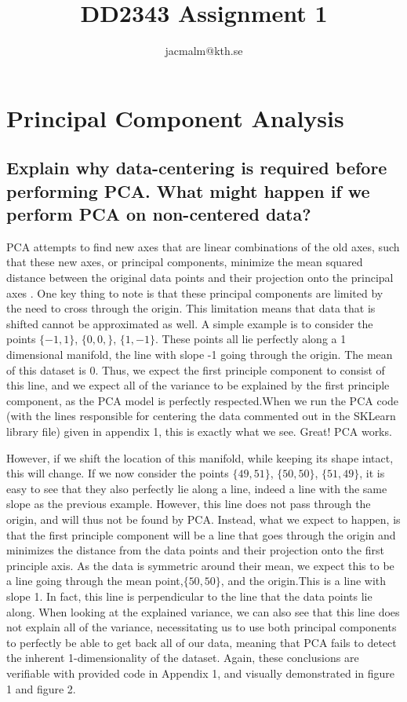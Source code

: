 \documentclass[11pt,a4paper,landscape]{article}
\author{jacmalm@kth.se}
\title{DD2343 Assignment 1}
\begin{document}
\maketitle
\newpage
\section{Principal Component Analysis}

\subsection{Explain why data-centering is required before performing PCA.  What might happen if we perform PCA on non-centered data?}

PCA attempts to find new axes that are linear combinations of the old axes, such that these new axes, or principal components, minimize the mean squared distance between the original data points and their projection onto the principal axes \cite{pca_lecture_book}.  One key thing to note is that these principal components are limited by the need to cross through the origin. This limitation means that data that is shifted cannot be approximated as well. A simple example is to consider the points $\lbrace-1, 1\rbrace$, $\lbrace0,0,\rbrace$, $\lbrace1, -1\rbrace$. These points all lie perfectly along a 1 dimensional manifold, the line with slope -1 going through the origin. The mean of this dataset is 0. Thus, we expect the first principle component to consist of this line, and we expect all of the variance to be explained by the first principle component, as the PCA model is perfectly respected.When we run the PCA code (with the lines responsible for centering the data commented out in the SKLearn library file) given in appendix 1, this is exactly what we see. Great! PCA works.\newline

However, if we shift the location of this manifold, while keeping its shape intact, this will change. If we now consider the points $\lbrace49, 51\rbrace$, $\lbrace50,50\rbrace$, $\lbrace51, 49\rbrace$, it is easy to see that they also perfectly lie along a line, indeed a line with the same slope as the previous example. However, this line does not pass through the origin, and will thus not be found by PCA. Instead, what we expect to happen, is that the first principle component will be a line that goes through the origin and minimizes the distance from the data points and their projection onto the first principle axis. As the data is symmetric around their mean, we expect this to be a line going through the mean point,$\lbrace50,50\rbrace$, and the origin.This is a line with slope 1. In fact, this line is perpendicular to the line that the data points lie along. When looking at the explained variance, we can also see that this line does not explain all of the variance, necessitating us to use both principal components to perfectly be able to get back all of our data, meaning that PCA fails to detect the inherent 1-dimensionality of the dataset. Again, these conclusions are verifiable with provided code in Appendix 1, and visually demonstrated in figure 1 and figure 2.
\end{document}
